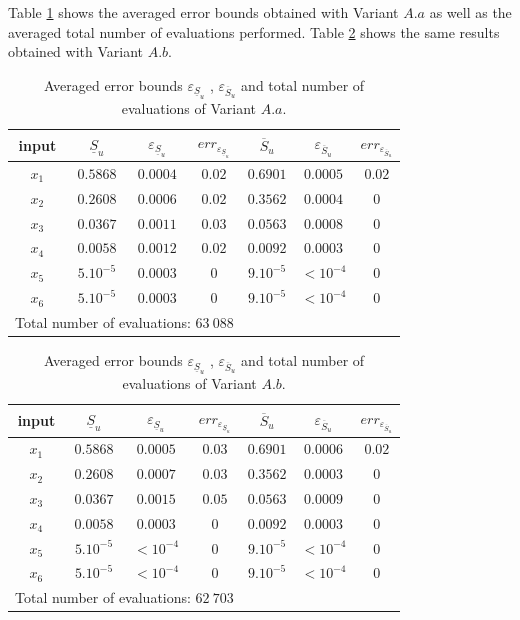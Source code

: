Table \ref{res.gfunc.Aa} shows the averaged error bounds obtained with Variant $A.a$ as well as the averaged total number of evaluations performed. Table \ref{res.gfunc.Ab} shows the same results obtained with Variant $A.b$.
\renewcommand{\arraystretch}{1.25}
\begin{table}[!ht]
\caption{Averaged error bounds $\varepsilon_{\underline{S}_u}$ , $\varepsilon_{\overline{S}_u}$ and total number of evaluations of Variant $A.a$.}
\centering
\begin{tabular}{ccccccc}
\hline
 input & $\underline{S}_u$ & $\varepsilon_{\underline{S}_u}$ & ${err}_{\varepsilon_{\underline{S}_u}}$ & $\overline{S}_u$ & $\varepsilon_{\overline{S}_u}$ &$err_{\varepsilon_{\overline{S}_u}}$ \\ \hline
 $x_1$ & $0.5868$ &  $0.0004$ & $0.02$ & $0.6901$ & $0.0005$ & $0.02$ \\ \hline
 $x_2$ & $0.2608$ &  $0.0006$ & $0.02$ & $0.3562$ & $0.0004$ & $0$ \\ \hline
 $x_3$ & $0.0367$ &  $0.0011$ & $0.03$ & $0.0563$ & $0.0008$ & $0$ \\ \hline
 $x_4$ & $0.0058$ &  $0.0012$ & $0.02$ & $0.0092$ & $0.0003$ & $0$ \\ \hline
 $x_5$ & $5.10^{-5}$ & $0.0003$ & $0$ & $9.10^{-5}$ & $< 10^{-4}$ & $0$ \\ \hline
 $x_6$ & $5.10^{-5}$ & $0.0003$ & $0$  & $9.10^{-5}$ & $< 10^{-4}$ & $0$ \\ \hline \hline
\multicolumn{4}{l}{Total number of evaluations: $63 \ 088$} & & &\\ \hline 
\end{tabular}
\label{res.gfunc.Aa}
\end{table}
\begin{table}[!ht]
\caption{Averaged error bounds $\varepsilon_{\underline{S}_u}$ , $\varepsilon_{\overline{S}_u}$ and total number of evaluations of Variant $A.b$.}
\centering
\begin{tabular}{ccccccc}
\hline
 input & $\underline{S}_u$ & $\varepsilon_{\underline{S}_u}$ & ${err}_{\varepsilon_{\underline{S}_u}}$ & $\overline{S}_u$ & $\varepsilon_{\overline{S}_u}$ &$err_{\varepsilon_{\overline{S}_u}}$ \\ \hline
 $x_1$ & $0.5868$ &  $0.0005$ & $0.03$ & $0.6901$ & $0.0006$ & $0.02$ \\ \hline
 $x_2$ & $0.2608$ &  $0.0007$ & $0.03$ & $0.3562$ & $0.0003$ & $0$ \\ \hline
 $x_3$ & $0.0367$ &  $0.0015$ & $0.05$ & $0.0563$ & $0.0009$ & $0$ \\ \hline
 $x_4$ & $0.0058$ &  $0.0003$ & $0$ & $0.0092$ & $0.0003$ & $0$ \\ \hline
 $x_5$ & $5.10^{-5}$ & $< 10^{-4}$ & $0$ & $9.10^{-5}$ & $< 10^{-4}$ & $0$ \\ \hline
 $x_6$ & $5.10^{-5}$ & $< 10^{-4}$ & $0$  & $9.10^{-5}$ & $< 10^{-4}$ & $0$ \\ \hline \hline
\multicolumn{4}{l}{Total number of evaluations: $62 \ 703$} & & &\\ \hline 
\end{tabular}
\label{res.gfunc.Ab}
\end{table}
